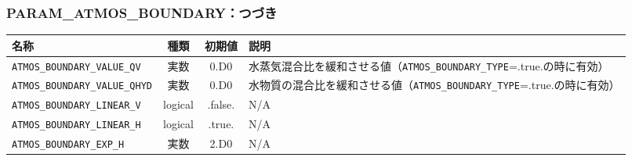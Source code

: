 \subsubsection{PARAM\_ATMOS\_BOUNDARY：つづき}
\begin{tabularx}{150mm}{|l|c|c|X|} \hline
 \rowcolor[gray]{0.9} 名称 & 種類 & 初期値 & 説明 \\ \hline
 \verb|ATMOS_BOUNDARY_VALUE_QV| & 実数 & 0.D0 & 水蒸気混合比を緩和させる値（\verb|ATMOS_BOUNDARY_TYPE|=.true.の時に有効） \\ \hline
 \verb|ATMOS_BOUNDARY_VALUE_QHYD| & 実数 & 0.D0 & 水物質の混合比を緩和させる値（\verb|ATMOS_BOUNDARY_TYPE|=.true.の時に有効） \\ \hline
 \verb|ATMOS_BOUNDARY_LINEAR_V| & logical & .false. &  N/A \\ \hline
 \verb|ATMOS_BOUNDARY_LINEAR_H| & logical & .true.  &  N/A \\ \hline
 \verb|ATMOS_BOUNDARY_EXP_H| & 実数 & 2.D0 & N/A  \\ \hline
\end{tabularx}


